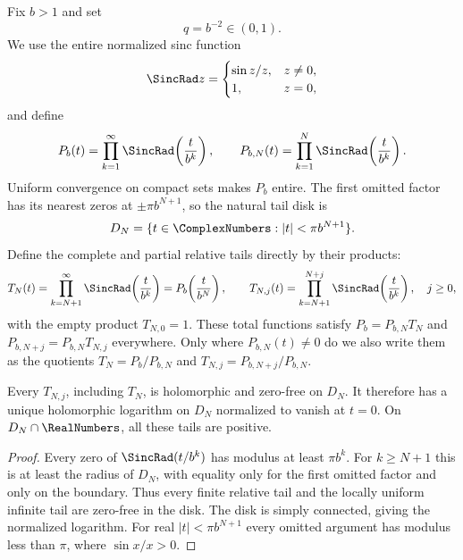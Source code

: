 \documentclass[11pt]{article}
\numberwithin{equation}{section}
\theoremstyle{definition}
\theoremstyle{remark}
\begin{document}
Fix $b>1$ and set
\begin{equation}
 q=b^{-2}\in(0,1).
 \label{p3:eq:qdef}
\end{equation}
We use the entire normalized sinc function
\[
 \SincRad z=\begin{cases}\sin z/z,&z\ne0,\\1,&z=0,
 \end{cases}
\]
and define
\begin{equation}
 P_b(t)=\prod_{k=1}^{\infty}\SincRad\!\left(\frac{t}{b^k}\right),
 \qquad
 P_{b,N}(t)=\prod_{k=1}^{N}\SincRad\!\left(\frac{t}{b^k}\right).
 \label{p3:eq:Pb}
\end{equation}
Uniform convergence on compact sets makes $P_b$ entire.  The first omitted factor has its
nearest zeros at $\pm\pi b^{N+1}$, so the natural tail disk is
\begin{equation}
 D_N=\{t\in\ComplexNumbers:|t|<\pi b^{N+1}\}.
 \label{p3:eq:DN}
\end{equation}
Define the complete and partial relative tails directly by their products:
\begin{equation}
 T_N(t)=\prod_{k=N+1}^{\infty}\SincRad\!\left(\frac{t}{b^k}\right)
       =P_b\!\left(\frac{t}{b^N}\right),
 \qquad
 T_{N,j}(t)=\prod_{k=N+1}^{N+j}\SincRad\!\left(\frac{t}{b^k}\right),\quad j\ge0,
 \label{p3:eq:tails}
\end{equation}
with the empty product $T_{N,0}=1$.  These total functions satisfy
$P_b=P_{b,N}T_N$ and $P_{b,N+j}=P_{b,N}T_{N,j}$ everywhere.  Only where
$P_{b,N}(t)\ne0$ do we also write them as the quotients
$T_N=P_b/P_{b,N}$ and $T_{N,j}=P_{b,N+j}/P_{b,N}$.

\begin{lemma}\label{p3:lem:zero-free-tail}
Every $T_{N,j}$, including $T_N$, is holomorphic and zero-free on $D_N$.  It therefore has a
unique holomorphic logarithm on $D_N$ normalized to vanish at $t=0$.  On
$D_N\cap\RealNumbers$, all these tails are positive.
\end{lemma}

\begin{proof}
Every zero of $\SincRad(t/b^k)$ has modulus at least $\pi b^k$.  For $k\ge N+1$
this is at least the radius of $D_N$, with equality only for the first omitted factor and only
on the boundary.  Thus every finite relative tail and the locally uniform infinite tail are
zero-free in the disk.  The disk is simply connected, giving the normalized logarithm.
For real $|t|<\pi b^{N+1}$ every omitted argument has modulus less than $\pi$, where
$\sin x/x>0$.
\end{proof}
\end{document}
